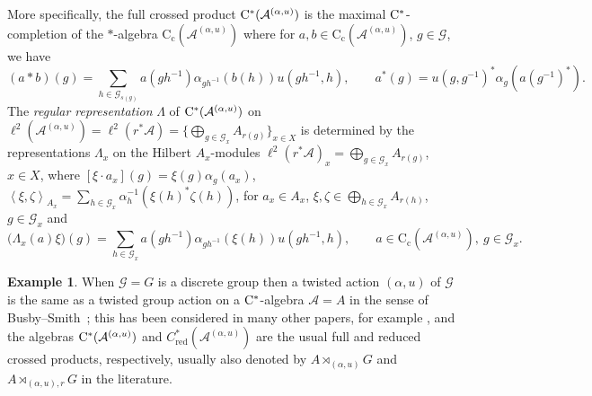 \documentclass[11 pt, leqno]{amsart}
\numberwithin{equation}{section}
\theoremstyle{plain}
\theoremstyle{definition}
\newtheorem {rem} [thm]{Remark}
\newtheorem{ex}[thm]{Example}
\newcommand*{\contc}{\mathrm{C_c}}%
\DeclareMathOperator{\red}{red}%
\newcommand{\LL}{\mathcal L}
\newcommand{\G}{\mathcal G} %
\newcommand{\A}{\mathcal A}
\newcommand{\C}{\mathbb C}
\newcommand{\cst}{\ifmmode\mathrm{C}^*\else{$\mathrm{C}^*$}\fi}
\begin{document}
More specifically, the full crossed product $\cst(\A^{(\alpha,u)})$ is the maximal $\cst$-completion of the $*$-algebra $\contc(\A^{(\alpha,u)})$ where
for $a, b \in \contc(\A^{(\alpha,u)})$, $g \in \G$, we have
\[
    (a*b)(g)=\sum_{h\in \G_{s(g)}} a(gh^{-1})\alpha_{g h^{-1}}(b(h))u(gh^{-1},h),\quad  \quad  a^*(g)= u(g,g^{-1})^*\alpha_{g}(a(g^{-1})^*).
\]
The \emph{regular representation} $\Lambda$  of $\cst(\A^{(\alpha,u)})$ on $\ell^2(\A^{(\alpha,u)})=\ell^2(r^*\A)=\{\bigoplus_{g \in \G_x} A_{r(g)}\}_{x\in X}$ is determined by the representations $\Lambda_x$ on the Hilbert $A_x$-modules %
$\ell^2(r^*\A)_x=\bigoplus_{g \in \G_x} A_{r(g)}$, $x\in X$, where $[\xi \cdot a_x](g)= \xi(g)\alpha_{g}(a_x)$, $\left\langle \xi, \zeta\right\rangle_{A_x}=\sum_{h \in \G_x} \alpha_{h}^{-1}(\xi(h)^*\zeta(h))$, for $a_x\in A_x$, $\xi, \zeta \in \bigoplus_{h \in \G_x} A_{r(h)}$, $g \in \G_x$ and
\begin{equation}\label{eq:regular-rep-twisted-actions}
    \big( \Lambda_x(a)\xi \big)(g) = \sum_{h \in \G_x} a(g h^{-1}) \alpha_{g h^{-1}}(\xi(h))u(gh^{-1},h) , \qquad a \in \contc(\A^{(\alpha,u)}) ,\ g \in \G_x .
\end{equation}


\begin{ex} \label{ex:groupoid crossed product}
When $\G=G$ is a discrete group then a twisted action $(\alpha, u)$ of $\G$ is the same as a twisted group action on a $\cst$-algebra $\A=A$ in the sense of Busby--Smith~\cite{BusbySmith}; this has been considered in many other papers, for example \cite{PackerRaeburn,BedosContiregular,BedosConti,BedosConti2}, and the algebras $\cst(\A^{(\alpha,u)})$ and $C_{\red}^*(\A^{(\alpha,u)})$ are the usual full and reduced crossed products, respectively, usually also denoted by $A\rtimes_{(\alpha,u)}G$ and $A\rtimes_{(\alpha,u),r}G$ in the literature.  
\end{ex}
\end{document}
